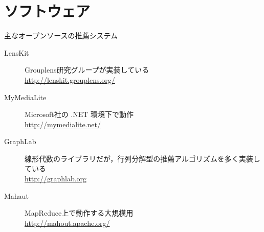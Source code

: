 \section{ソフトウェア}
\label{sec:reference-software}

主なオープンソースの推薦システム
\begin{description}
\item[LensKit]
Grouplens研究グループが実装している\\
\url{http://lenskit.grouplens.org/}
\item[MyMediaLite]
Microsoft社の .NET 環境下で動作\\
\url{http://mymedialite.net/}
\item[GraphLab]
線形代数のライブラリだが，行列分解型の推薦アルゴリズムを多く実装している\\
\url{http://graphlab.org}
\item[Mahaut] MapReduce上で動作する大規模用\\
\url{http://mahout.apache.org/}
\end{description}
